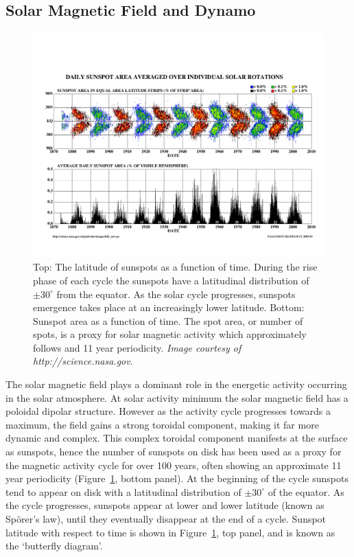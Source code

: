 \subsection{Solar Magnetic Field and Dynamo}\label{sec:dynamo}
\begin{figure}[!t]
\begin{center}
\includegraphics[scale=0.55, trim =1cm 2cm 0cm 4cm]{images/bfly_new.pdf}
\caption[The solar butterfly diagram]{Top: The latitude of sunspots as a function of time. During the rise phase of each cycle the sunspots have a latitudinal distribution of $\pm30^{\circ}$ from the equator.  As the solar cycle progresses, sunspots emergence takes place at an increasingly lower latitude. Bottom: Sunspot area as a function of time. The spot area, or number of spots, is a proxy for solar magnetic activity which approximately follows and 11 year periodicity. \emph{Image courtesy of http://science.nasa.gov}.}
\label{fig:butterfly} 
\end{center}
\end{figure}

The solar magnetic field plays a dominant role in the energetic activity occurring in the solar atmosphere. At solar activity minimum the solar magnetic field has a poloidal dipolar structure. However as the activity cycle progresses towards a maximum, the field gains a strong toroidal component, making it far more dynamic and complex. This complex toroidal component manifests at the surface as sunspots, hence the number of sunspots on disk has been used as a proxy for the magnetic activity cycle for over 100 years, often showing an approximate 11 year periodicity (Figure~\ref{fig:butterfly}, bottom panel). At the beginning of the cycle sunspots tend to appear on disk with a latitudinal distribution of $\pm30^{\circ}$ of the equator. As the cycle progresses, sunspots appear at lower and lower latitude (known as Sp\"{o}rer's law), until they eventually disappear at the end of a cycle. Sunspot latitude with respect to time is shown in Figure~\ref{fig:butterfly}, top panel, and is known as the `butterfly diagram'.

